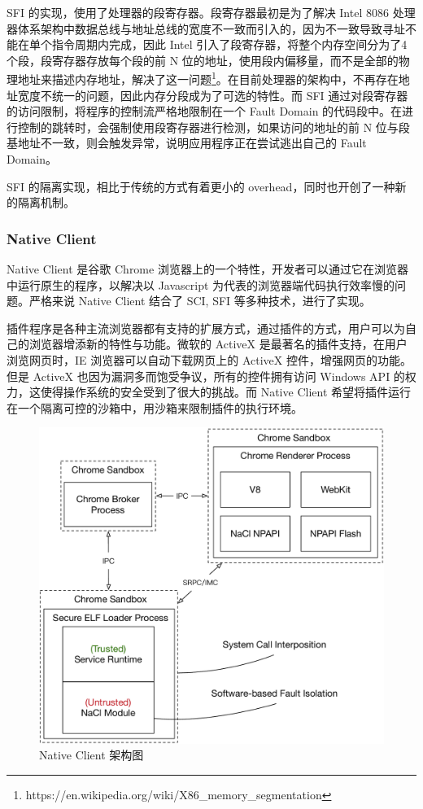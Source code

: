 \documentclass[final,5p,times]{elsarticle}
\begin{document}
SFI 的实现，使用了处理器的段寄存器。段寄存器最初是为了解决 Intel 8086 处理器体系架构中数据总线与地址总线的宽度不一致而引入的，因为不一致导致寻址不能在单个指令周期内完成，因此 Intel 引入了段寄存器，将整个内存空间分为了4个段，段寄存器存放每个段的前 N 位的地址，使用段内偏移量，而不是全部的物理地址来描述内存地址，解决了这一问题\footnote{https://en.wikipedia.org/wiki/X86\_memory\_segmentation}。在目前处理器的架构中，不再存在地址宽度不统一的问题，因此内存分段成为了可选的特性。而 SFI 通过对段寄存器的访问限制，将程序的控制流严格地限制在一个 Fault Domain 的代码段中。在进行控制的跳转时，会强制使用段寄存器进行检测，如果访问的地址的前 N 位与段基地址不一致，则会触发异常，说明应用程序正在尝试逃出自己的 Fault Domain。

SFI 的隔离实现，相比于传统的方式有着更小的 overhead，同时也开创了一种新的隔离机制。

\subsubsection{Native Client}
\label{sss:nacl}

Native Client 是谷歌 Chrome 浏览器上的一个特性，开发者可以通过它在浏览器中运行原生的程序，以解决以 Javascript 为代表的浏览器端代码执行效率慢的问题。严格来说 Native Client 结合了 SCI, SFI 等多种技术，进行了实现。

插件程序是各种主流浏览器都有支持的扩展方式，通过插件的方式，用户可以为自己的浏览器增添新的特性与功能。微软的 ActiveX 是最著名的插件支持，在用户浏览网页时，IE 浏览器可以自动下载网页上的 ActiveX 控件，增强网页的功能。但是 ActiveX 也因为漏洞多而饱受争议，所有的控件拥有访问 Windows API 的权力，这使得操作系统的安全受到了很大的挑战。而 Native Client 希望将插件运行在一个隔离可控的沙箱中，用沙箱来限制插件的执行环境。

\begin{figure}
\centering
\includegraphics[width=0.65\linewidth]{imgs/nacl}
\caption{Native Client 架构图}
\label{fig:nacl}
\end{figure}
\end{document}
